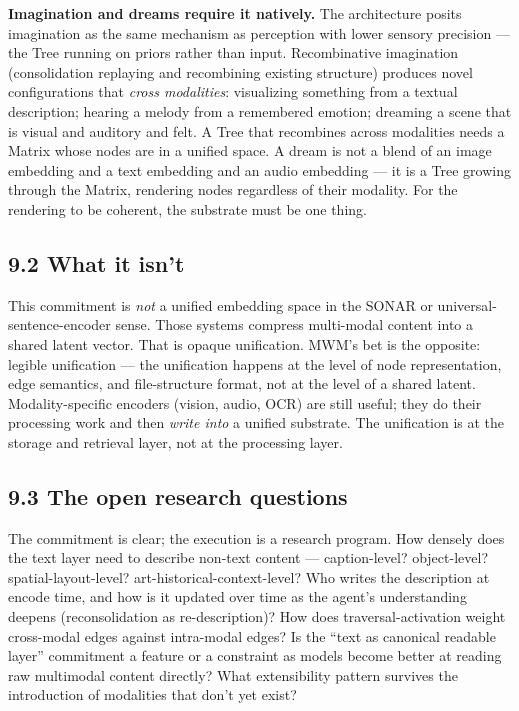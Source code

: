 \documentclass[12pt]{article}
\begin{document}
\textbf{Imagination and dreams require it natively.} The architecture posits imagination as the same mechanism as perception with lower sensory precision --- the Tree running on priors rather than input. Recombinative imagination (consolidation replaying and recombining existing structure) produces novel configurations that \emph{cross modalities}: visualizing something from a textual description; hearing a melody from a remembered emotion; dreaming a scene that is visual and auditory and felt. A Tree that recombines across modalities needs a Matrix whose nodes are in a unified space. A dream is not a blend of an image embedding and a text embedding and an audio embedding --- it is a Tree growing through the Matrix, rendering nodes regardless of their modality. For the rendering to be coherent, the substrate must be one thing.

\subsection{9.2 What it isn't}\label{what-it-isnt}

This commitment is \emph{not} a unified embedding space in the SONAR or universal-sentence-encoder sense. Those systems compress multi-modal content into a shared latent vector. That is opaque unification. MWM's bet is the opposite: legible unification --- the unification happens at the level of node representation, edge semantics, and file-structure format, not at the level of a shared latent. Modality-specific encoders (vision, audio, OCR) are still useful; they do their processing work and then \emph{write into} a unified substrate. The unification is at the storage and retrieval layer, not at the processing layer.

\subsection{9.3 The open research questions}\label{the-open-research-questions}

The commitment is clear; the execution is a research program. How densely does the text layer need to describe non-text content --- caption-level? object-level? spatial-layout-level? art-historical-context-level? Who writes the description at encode time, and how is it updated over time as the agent's understanding deepens (reconsolidation as re-description)? How does traversal-activation weight cross-modal edges against intra-modal edges? Is the ``text as canonical readable layer'' commitment a feature or a constraint as models become better at reading raw multimodal content directly? What extensibility pattern survives the introduction of modalities that don't yet exist?
\end{document}
